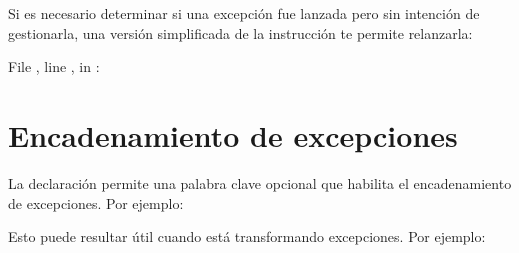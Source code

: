 \documentclass[a5paper,10pt,spanish]{sphinxmanual}
\begin{document}
\begin{sphinxVerbatim}[commandchars=\\\{\}]
   
\end{sphinxVerbatim}

\sphinxAtStartPar
Si es necesario determinar si una excepción fue lanzada pero sin intención de gestionarla, una versión simplificada de la instrucción  te permite relanzarla:

\begin{sphinxVerbatim}[commandchars=\\\{\}]
     
 
    
    
  File , line , in 
: 
\end{sphinxVerbatim}


\section{Encadenamiento de excepciones}
\label{\detokenize{tutorial/errors:exception-chaining}}\label{\detokenize{tutorial/errors:tut-exception-chaining}}
\sphinxAtStartPar
La declaración  permite una palabra clave opcional  que habilita el encadenamiento de excepciones. Por ejemplo:

\begin{sphinxVerbatim}[commandchars=\\\{\}]
   
\end{sphinxVerbatim}

\sphinxAtStartPar
Esto puede resultar útil cuando está transformando excepciones. Por ejemplo:
\end{document}
